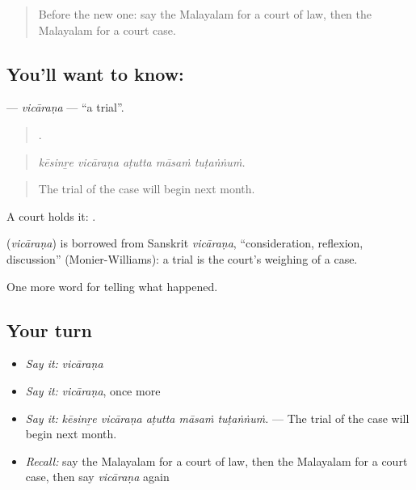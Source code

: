 \begin{quote}
Before the new one: say the Malayalam for a court of law, then the Malayalam for a court case.
\end{quote}

\subsection*{You'll want to know: }
\textbf{} — \emph{vicāraṇa} — \textquotedblleft{}a trial\textquotedblright{}.

\begin{quote}
    .
\end{quote}

\begin{quote}
\emph{kēsinṟe vicāraṇa aṭutta māsaṁ tuṭaṅṅuṁ.}
\end{quote}

\begin{quote}
The trial of the case will begin next month.
\end{quote}

A court holds it:  .

\begin{cousinweb}
\textbf{} (\emph{vicāraṇa}) is borrowed from Sanskrit \emph{vicāraṇa}, \textquotedblleft{}consideration, reflexion, discussion\textquotedblright{} (Monier-Williams): a trial is the court's weighing of a case.
\end{cousinweb}

\begin{grammarlens}[title={What you've built}]
One more word for telling what happened.
\end{grammarlens}

\subsection*{Your turn}
\begin{itemize}
\raggedright
  \item \emph{Say it:} \emph{vicāraṇa}
  \item \emph{Say it:} \emph{vicāraṇa}, once more
  \item \emph{Say it:} \emph{kēsinṟe vicāraṇa aṭutta māsaṁ tuṭaṅṅuṁ.} — The trial of the case will begin next month.
  \item \emph{Recall:} say the Malayalam for a court of law, then the Malayalam for a court case, then say \emph{vicāraṇa} again
\end{itemize}

